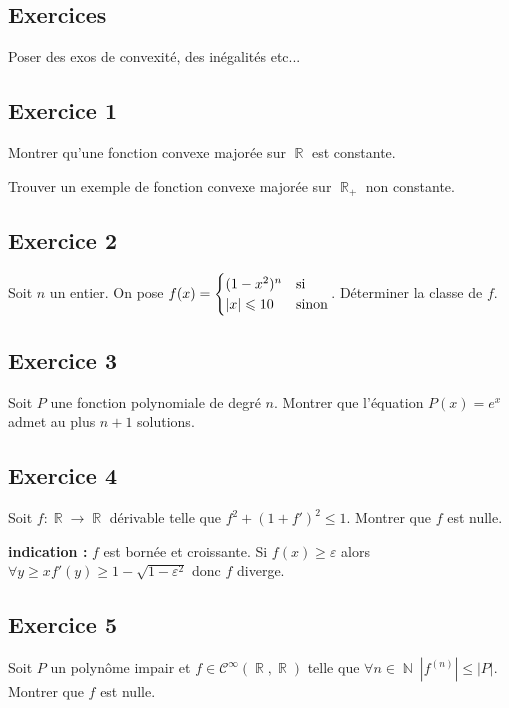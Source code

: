 \documentclass{article}
\DeclareMathOperator{\R}{\mathbb{R}}
\DeclareMathOperator{\N}{\mathbb{N}}
\begin{document}
\subsection*{Exercices}

Poser des exos de convexité, des inégalités etc... 

\subsection*{Exercice 1} 

Montrer qu'une fonction convexe majorée sur $\R$ est constante. 

Trouver un exemple de fonction convexe majorée sur $\R_+$ non constante. 

\subsection*{Exercice 2} 

Soit $n$ un entier. On pose $f(x) = \begin{cases} (1-x^2)^n & \text{si} \cr |x|\leqslant 1  0 & \text{sinon} \end{cases}$. Déterminer la classe de $f$. 

\subsection*{Exercice 3} 

Soit $P$ une fonction polynomiale de degré $n$. Montrer que l'équation $P(x) = e^x$ admet au plus $n+1$ solutions. 

\subsection*{Exercice 4} 

Soit $f  : \R \to \R$ dérivable telle que $f^2 + (1+f')^2 \leqslant 1$. Montrer que $f$ est nulle. 

\textbf{indication :} $f$ est bornée et croissante. Si $f(x) \geq \varepsilon$ alors $\forall y \geq x  f'(y) \geq 1 - \sqrt{1 - \varepsilon^2}$ donc $f$ diverge. 


\subsection*{Exercice 5} 

Soit $P$ un polynôme impair et $f \in \mathcal{C}^{\infty}(\R, \R)$ telle que $\forall n \in \N \ |f^{(n)}|\leq |P|$. Montrer que $f$ est nulle. 
\end{document}
